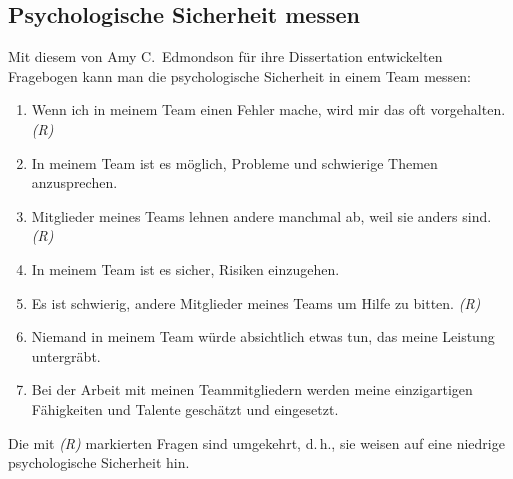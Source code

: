 \subsection{Psychologische Sicherheit messen}
\label{ps-messen}

Mit diesem von Amy C.~Edmondson für ihre Dissertation entwickelten Fragebogen kann man die psychologische Sicherheit in einem Team messen:

\begin{enumerate}
    \item Wenn ich in meinem Team einen Fehler mache, wird mir das oft vorgehalten. \emph{(R)}
    \item In meinem Team ist es möglich, Probleme und schwierige Themen anzusprechen.
    \item Mitglieder meines Teams lehnen andere manchmal ab, weil sie anders sind. \emph{(R)}
    \item In meinem Team ist es sicher, Risiken einzugehen.
    \item Es ist schwierig, andere Mitglieder meines Teams um Hilfe zu bitten. \emph{(R)}
    \item Niemand in meinem Team würde absichtlich etwas tun, das meine Leistung untergräbt.
    \item Bei der Arbeit mit meinen Teammitgliedern werden meine einzigartigen Fähigkeiten und Talente geschätzt und eingesetzt.
\end{enumerate}

Die mit \emph{(R)} markierten Fragen sind umgekehrt, d.\,h., sie weisen auf eine niedrige psychologische Sicherheit hin.
